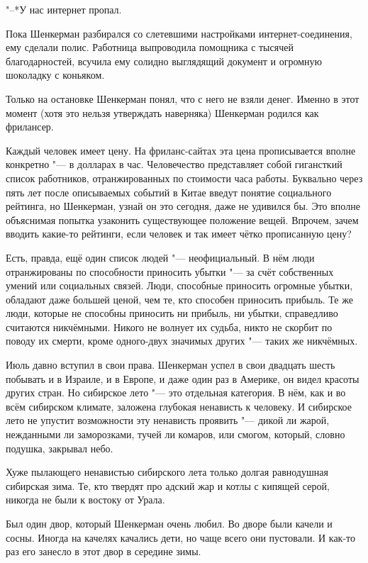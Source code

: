 "--*У нас интернет пропал.

Пока Шенкерман разбирался со слетевшими настройками интернет-соединения, ему сделали полис.
Работница выпроводила помощника с тысячей благодарностей, всучила ему солидно выглядящий документ и огромную шоколадку с коньяком.

Только на остановке Шенкерман понял, что с него не взяли денег.
Именно в этот момент (хотя это нельзя утверждать наверняка) Шенкерман родился как фрилансер.

Каждый человек имеет цену.
На фриланс-сайтах эта цена прописывается вполне конкретно "--- в долларах в час.
Человечество представляет собой гигансткий список работников, отранжированных по стоимости часа работы.
Буквально через пять лет после описываемых событий в Китае введут понятие социального рейтинга, но Шенкерман, узнай он это сегодня, даже не удивился бы.
Это вполне объяснимая попытка узаконить существующее положение вещей.
Впрочем, зачем вводить какие-то рейтинги, если человек и так имеет чётко прописанную цену?

Есть, правда, ещё один список людей "--- неофициальный.
В нём люди отранжированы по способности приносить убытки "--- за счёт собственных умений или социальных связей.
Люди, способные приносить огромные убытки, обладают даже большей ценой, чем те, кто способен приносить прибыль.
Те же люди, которые не способны приносить ни прибыль, ни убытки, справедливо считаются никчёмными.
Никого не волнует их судьба, никто не скорбит по поводу их смерти, кроме одного-двух значимых других "--- таких же никчёмных.

\asterism

Июль давно вступил в свои права.
Шенкерман успел в свои двадцать шесть побывать и в Израиле, и в Европе, и даже один раз в Америке, он видел красоты других стран.
Но сибирское лето "--- это отдельная категория.
В нём, как и во всём сибирском климате, заложена глубокая ненависть к человеку.
И сибирское лето не упустит возможности эту ненависть проявить "--- дикой ли жарой, нежданными ли заморозками, тучей ли комаров, или смогом, который, словно подушка, закрывал небо.

Хуже пылающего ненавистью сибирского лета только долгая равнодушная сибирская зима.
Те, кто твердят про адский жар и котлы с кипящей серой, никогда не были к востоку от Урала.

Был один двор, который Шенкерман очень любил.
Во дворе были качели и сосны.
Иногда на качелях качались дети, но чаще всего они пустовали.
И как-то раз его занесло в этот двор в середине зимы.

